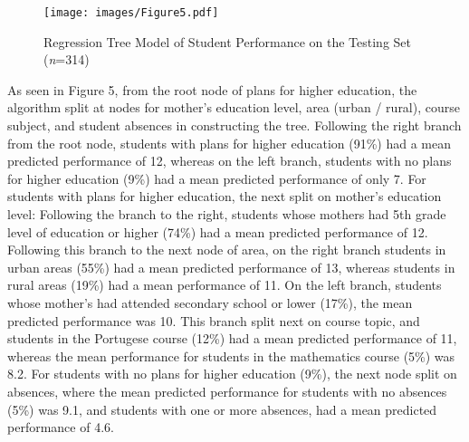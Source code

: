 \documentclass[sigconf]{acmart}
\begin{document}
\begin{figure}[!ht]
  \centering\texttt{[image: images/Figure5.pdf]}
  \caption{Regression Tree Model of Student Performance on the
  Testing Set (\textit{n}=314)}
  \label{f:Figure5}
\end{figure}

As seen in Figure 5, from the root node of plans for higher education, the 
algorithm split at nodes for mother's education level, area (urban / rural),
course subject, and student absences in constructing the tree. Following 
the right branch from the root node, students with plans for higher education 
(91\%) had a mean predicted performance of 12, whereas on the left branch, 
students with no plans for higher education (9\%) had a mean predicted
performance of only 7. For students with plans for higher education, the next 
split on mother's education level: Following the branch to the right, students 
whose mothers had 5th grade level of education or higher (74\%) had a mean 
predicted performance of 12. Following this branch to the next node of area, 
on the right branch students in urban areas (55\%) had a mean predicted
performance of 13, whereas students in rural areas (19\%) had a mean 
performance of 11. On the left branch, students whose mother's had attended 
secondary school or lower (17\%), the mean predicted performance was 10. This 
branch split next on course topic, and students in the Portugese course (12\%) 
had a mean predicted performance of 11, whereas the mean performance for 
students in the mathematics course (5\%) was 8.2. For students with no plans for 
higher education (9\%), the next node split on absences, where the mean 
predicted performance for students with no absences (5\%) was 9.1, and students 
with one or more absences, had a mean predicted performance of 4.6. 

\end{document}
